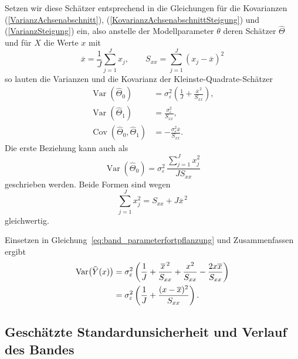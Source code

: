 Setzen wir diese Schätzer entsprechend in die Gleichungen für die Kovarianzen (\ref{VarianzAchsenabschnitt}), (\ref{KovarianzAchsenabschnittSteigung}) und (\ref{VarianzSteigung}) ein, also anstelle der Modellparameter $\theta$ deren Schätzer $\widehat \Theta$ und für $X$ die Werte $x$ mit 
\begin{equation}
  \overline{x}=\frac{1}{J}\sum_{j=1}^{J}x_j,
  \qquad
  S_{xx}=\sum_{j=1}^{J}(x_j-\overline{x})^2
\end{equation}
so lauten die Varianzen und die Kovarianz der
Kleinste-Quadrate-Schätzer
\begin{align}
  \operatorname{Var}(\widehat{\Theta}_0)
  &=\sigma_\varepsilon^2
    \left(\frac{1}{J}+\frac{\overline{x}^{\,2}}{S_{xx}}\right),
  \label{eq:band_var_achsenabschnitt}\\
  \operatorname{Var}(\widehat{\Theta}_1)
  &=\frac{\sigma_\varepsilon^2}{S_{xx}},
  \label{eq:band_var_steigung}\\
  \operatorname{Cov}(\widehat{\Theta}_0,\widehat{\Theta}_1)
  &=-\frac{\sigma_\varepsilon^2\overline{x}}{S_{xx}}.
  \label{eq:band_cov_parameter}
\end{align}
Die erste Beziehung kann auch als
\begin{equation}
  \operatorname{Var}(\widehat{\Theta}_0)
  =\sigma_\varepsilon^2\,
    \frac{\sum_{j=1}^{J}x_j^2}{J S_{xx}}
\end{equation}
geschrieben werden. Beide Formen sind wegen
\begin{equation}
  \sum_{j=1}^{J}x_j^2
  =S_{xx}+J\overline{x}^{\,2}
\end{equation}
gleichwertig.

Einsetzen in Gleichung~\eqref{eq:band_parameterfortpflanzung}
und Zusammenfassen ergibt
\begin{align}
  \operatorname{Var}\bigl(\widehat{Y}(x)\bigr)
  &=
  \sigma_\varepsilon^2\left(
    \frac{1}{J}
    +\frac{\overline{x}^{\,2}}{S_{xx}}
    +\frac{x^2}{S_{xx}}
    -\frac{2x\overline{x}}{S_{xx}}
  \right)
  \notag\\
  &=
  \sigma_\varepsilon^2\left(
    \frac{1}{J}
    +\frac{(x-\overline{x})^2}{S_{xx}}
  \right).
  \label{eq:band_varianz_gerade}
\end{align}

\subsection{Geschätzte Standardunsicherheit und Verlauf des Bandes}

